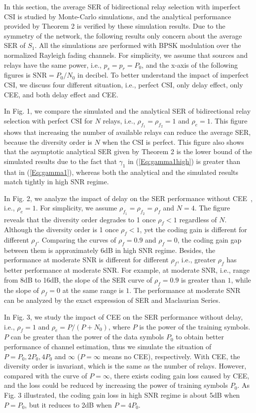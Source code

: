 \documentclass[onecolumn,letterpaper,11pt,draftclsnofoot]{IEEEtran}
\begin{document}
In this section, the average SER of bidirectional relay selection
with imperfect CSI is studied by Monte-Carlo simulations, and the
analytical performance provided by Theorem 2 is verified by these
simulation results. Due to the symmetry of the network, the
following results only concern about the average SER of $S_1$. All
the simulations are performed with BPSK modulation over the
normalized Rayleigh fading channels. For simplicity, we assume that
sources and relays have the same power, i.e., $p_s=p_r=P_0$, and the
x-axis of the following figures is $\mbox{SNR}=P_0/N_0$ in decibel.
To better understand the impact of imperfect CSI, we discuss four
different situation, i.e., perfect CSI, only delay effect, only CEE,
and both delay effect and CEE.

In Fig. 1, we compare the simulated and the analytical SER of
bidirectional relay selection with perfect CSI for $N$ relays, i.e.,
$\rho_{f_1}=\rho_{f_2}=1$ and $\rho_e=1$. This figure shows that
increasing the number of available relays can reduce the average
SER, because the diversity order is $N$ when the CSI is perfect.
This figure also shows that the asymptotic analytical SER given by
Theorem 2 is the lower bound of the simulated results due to the
fact that $\gamma_1$ in (\ref{Eq:gamma1high}) is greater than that
in (\ref{Eq:gamma1}), whereas both the analytical and the simulated
results match tightly in high SNR regime.

In Fig. 2, we analyze the impact of delay on the SER performance
without CEE~, i.e., $\rho_e=1$. For simplicity, we assume
$\rho_{f_1}=\rho_{f_2}=\rho_f$ and $N=4$. The figure reveals that
the diversity order degrades to 1 once $\rho_f<1$ regardless of $N$.
Although the diversity order is 1 once $\rho_f<1$, yet the coding
gain is different for different $\rho_f$. Comparing the curves of
$\rho_f=0.9$ and $\rho_f=0$, the coding gain gap between them is
approximately 6dB in high SNR regime. Besides, the performance at
moderate SNR is different for different $\rho_f$, i.e., greater
$\rho_f$ has better performance at moderate SNR. For example, at
moderate SNR, i.e., range from 8dB to 16dB, the slope of the SER
curve of $\rho_f=0.9$ is greater than $1$, while the slope of
$\rho_f=0$ at the same range is $1$. The performance at moderate SNR
can be analyzed by the exact expression of SER and Maclaurian
Series\cite{Zheng2003}.

In Fig. 3, we study the impact of CEE on the SER performance without
delay, i.e., $\rho_f=1$ and $\rho_e={P}/\left({P+N_0}\right)$, where
$P$ is the power of the training symbols\cite{Ramya2009}. $P$ can be
greater than the power of the data symbols $P_0$ to obtain better
performance of channel estimation, thus we simulate the situation of
$P=P_0, 2P_0, 4P_0$ and $\infty$ ($P=\infty$ means no CEE),
respectively. With CEE, the diversity order is invariant, which is
the same as the number of relays. However, compared with the curve
of $P=\infty$, there exists coding gain loss caused by CEE, and the
loss could be reduced by increasing the power of training symbols
$P_0$. As Fig. 3 illustrated, the coding gain loss in high SNR
regime is about 5dB when $P=P_0$, but it reduces to 2dB when
$P=4P_0$.
\end{document}
